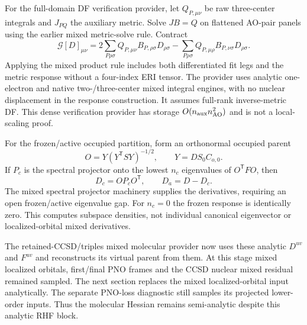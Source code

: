 \documentclass[11pt]{article}
\begin{document}
For the full-domain DF verification provider, let $Q_{P,\mu\nu}$ be raw
three-center integrals and $J_{PQ}$ the auxiliary metric. Solve
$J B=Q$ on flattened AO-pair panels using the earlier mixed metric-solve
rule. Contract
\begin{equation}
 \mathcal G[D]_{\mu\nu}
 =2\sum_{P\rho\sigma} Q_{P,\mu\nu}B_{P,\rho\sigma}D_{\rho\sigma}
  -\sum_{P\rho\sigma} Q_{P,\mu\rho}B_{P,\nu\sigma}D_{\rho\sigma}.
\end{equation}
Applying the mixed product rule includes both differentiated fit legs and
the metric response without a four-index ERI tensor. The provider uses
analytic one-electron and native two-/three-center mixed integral
engines, with no nuclear displacement in the response construction.
It assumes full-rank inverse-metric DF. This dense verification provider
has storage $O(n_{\rm aux}n_{\rm AO}^2)$ and is not a local-scaling proof.

For the frozen/active occupied partition, form an orthonormal occupied
parent
\begin{equation}
 O=Y(Y^{\mathsf T}S Y)^{-1/2},\qquad Y=D S_0 C_{o,0}.
\end{equation}
If $P_c$ is the spectral projector onto the lowest $n_c$ eigenvalues of
$O^{\mathsf T}F O$, then
\begin{equation}
 D_c=O P_c O^{\mathsf T},\qquad D_a=D-D_c.
\end{equation}
The mixed spectral projector machinery supplies the derivatives, requiring
an open frozen/active eigenvalue gap. For $n_c=0$ the frozen response is
identically zero. This computes subspace densities, not individual
canonical eigenvector or localized-orbital mixed derivatives.

The retained-CCSD/triples mixed molecular provider now uses these analytic
$D^{uv}$ and $F^{uv}$ and reconstructs its virtual parent from them.
At this stage mixed localized orbitals, first/final PNO frames and the
CCSD nuclear mixed residual remained sampled. The next section replaces
the mixed localized-orbital input analytically. The separate PNO-loss diagnostic still samples
its projected lower-order inputs. Thus the molecular Hessian remains
semi-analytic despite this analytic RHF block.
\end{document}
